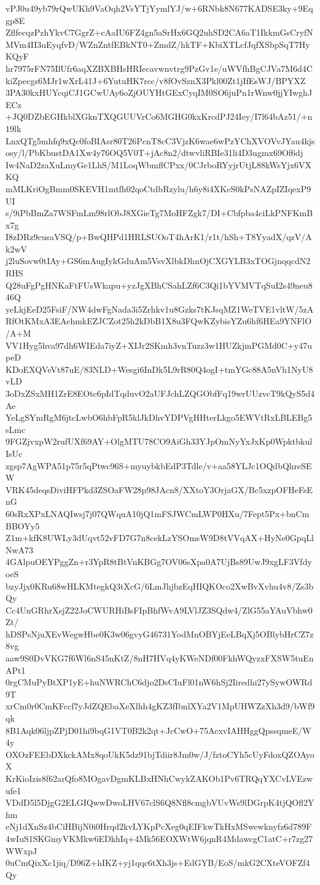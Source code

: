vPJ0u49yb79rQwUKh9VaOqh2VsYTjYymlYJ/w+6RNbk8N677KADSE3ky+9Eqgp8E
ZflfecqzPzhYkvC7GgrZ+cAaIU6FZ4gn5aSrHx6GQ2uhSD2CA6aT1IkkmGsCryfN
MVm4II3uEyqfvD/WZnZntfEBkNT0+ZmdZ/hkTF+KbiXTLcfJqfXSbpSqT7HyKQyF
hr7975rFN75IlUfr6aqXZBXBHsHRIecavwnvtrg9PzGv1e/uWVfhBgCJVa7M6d4C
kiZpecgs6MJr1wXrL41J+6YutuHK7rcc/v8fOvSznX3Pkl00Zt1jIfEsWJ/BPYXZ
3PA30kxHUYcqiCJ1GCwUAy6oZjOUYHtGExCyqIM0SO6juPn1rWnw0jjYIwghJECz
+JQ0DZbEGHkblXGknTXQGUUVrCo6MGHG0kxKrcdPJ24Iey/I7l64bAz51/+n19lk
LnxQTg5mhfq9xQc0foBIAsr80T26PcnT8cC3VjzK6wae6wPzYChXVOVvJYau4kjs
osy/l/PbKbustDA1Xw4y76OQ5V0T+jAc8n2/dtwvliRBIe31li4D3ugmx69Of6dj
Iw4NaD2zaXuLmyGe1LhS/M1LoqWbmflCPxx/0CJrboRYyjrUtjL88kWsYjx6VXKQ
mMLKriOgBmm0SKEVH1mtfh02qoCtdbRzylu/h6y8i4XKeS0kPsNAZpIZIqexP9UI
s/9iPbBmZa7WSFmLm98rlObJ8XGieTg7MoHFZgk7/DI+Cbfpba4ciLkPNFKmBx7g
I8zDRz9cusaVSQ/p+BwQHPd1HRLSUOoT4hArK1/r1t/hSh+T8YyadX/qzV/Ak2wV
j2luSovw0tIAy+GS6mAugIykGduAm5VsvXlbkDhnOjCXGYLB3xTOGjnqqcdN2RHS
Q28uFgPgHNKaFtFUsWkapu+yzJgXBhCSahLZf6C3Qi1bYVMVTqSuI2s49neu846Q
yeLkjEeD25FsiF/NW4dwFgNada3i5Zrhkv1u8Gzks7tKJsqMZ1WeTVE1vltW/5zA
RfOtKMxA3EAehmkEZJCZot25h2kDbB1X8u3FQwKZybisYZu6hf6HEa9YNFlO/A+M
VV1Hyg5hva97dh6WIEda7iyZ+XIJr2SKmh3vnTuzz3w1HUZkjmPGMd0C+y47upeD
KDoEXQVeVt87uE/83NLD+Wesgi6InDk5L9rR80Q4ogI+tmYGc88A5nVh1NyU8vLD
3oDxZSxMH1ZrE8EOtc6pIdTqduvO2aUFJchLZQGObfFq19wrUUzvcT9kQyS5d4Ae
YeLgSYmRgM6jtcLwbO6hbFpR5klJkDhvYDPVgHHterLkgo5EWVtRxLBLEBg5sLmc
9FGZjvxpW2rufUXf69AY+OlgMTU78CO9AiGh33YJpOmNyYxJxKp0WpktbkulIsUc
zgsp7AgWPA51p75r5qPtwc96S+myuybkbEdP3Tdle/v+aa58YLJc1OQdbQhreSEW
VRK45deqsDiviHFPkd3ZSOaFW28p98JAcn8/XXtoY3OrjaGX/Bc5xzpOFHeFsEnG
60sRxXPxLNAQIwsj7j07QWquA10jQ1mFSJWCmLWP0HXu/7Fept5Px+bnCmBBOYy5
Z1m+kfK8UWLy3dUqvt52vFD7G7n8cekLzYSOmsW9D8tVVqAX+HyNe0GpqLlNwA73
4GAlpuOEYPggZn+r3YpR8tBtVnKBGg7OV06sXpa0A7UjBs89UwJ9xgLF3VfdyoeS
bzyJjx0KRu68wHLKMtegkQ3tXcG/6LmJhjbzEqHIQKOco2XwBvXvhu4v8/Zs3bQy
Cc4UnGRhrXsjZ22JoCWURHiBsFIpBhfWvA9LVlJZ3SQdw4/ZlG55aYAuVbhw0Zt/
hDSPsNjuXEvWegwHbe0K3w06gvyG46731YodMnOBYjEeLBqXj5OBlybHrCZ7z8vg
aaw9S0DvVKG7f6Wl6nS45nKtZ/8nH7HVq4yKWeNDf00FkhWQyzxFXSW5tuEnAPt1
0rgCMuPyBtXP1yE+huNWRChC6djo2DsCIuFl01nW6hSj2Iiredhi27ySywOWRd9T
xrCm0r0CmKFccf7yJdZQEbaXeXlhh4gKZ3fIbnlXYa2V1MpUHWZzXh3d9/bWf9qk
8B1Aqk06ljpZPjD01hi9bqG1VT0B2k2qt+JcCwO+75AcxvIAHHggQpssqmeE/W4y
OXOzFEEbDXkckAMx8qoUkK5dz91bjTdiir8Jm0w/J/fztoCYh5cUyFdoxQZOAyoX
KrKioIzis8f62arQfo8MOgavDgmKLBxHNhCwykZAKOb1Pv6TRQqYXCvLVEzwufe1
VDdD5l5DjgG2ELGIQwwDwoLHV67clS6Q8Nfl8cmgbVUvWs9lDGrpK4tjQOfl2Yhm
eNj1dXnSz4bCiHBijN0i0Hrqd2kvLYKpPcXeg0qEIFkwTkHxMSwewknyfz6d789F
4wIuS1SKGmyVKMkw6EDkhIq+4Mk56EOXWtW6jqnR4MdawcgC1atC+r7zg27WWxpJ
0uCmQixXc1jiq/D96Z+hIKZ+yj1qqc6tXh3js+EdGYB/EoS/mkG2CXteVOFZf4Qy
